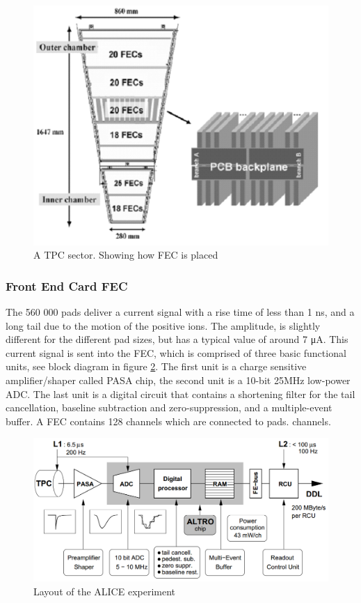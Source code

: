 \documentclass[12pt]{article}
\numberwithin{figure}{section}
\begin{document}
\begin{figure}[!htbp]
  \centering
  \includegraphics[width=\textwidth]{TPC_Sections.png}
  \caption{A TPC sector. Showing how FEC is placed \cite{roed}}
  \label{TPC_Sections}
\end{figure}

\subsubsection{Front End Card FEC}
The 560 000 pads deliver a current signal with a rise time of less than 1 ns, and a long tail due to the motion of the positive ions.
The amplitude, is slightly different for the different pad sizes, but has a typical value of around 7 μA.
This current signal is sent into the \acf{FEC}, which is comprised of three basic functional units, see block diagram in figure \ref{FEC_blockdiagram}.
The first unit is a charge sensitive amplifier/shaper called PASA chip, the second unit is a 10-bit 25MHz low-power ADC.
The last unit is a digital circuit that contains a shortening filter for the tail cancellation, baseline subtraction
and zero-suppression, and a multiple-event buffer. A \acf{FEC} contains 128 channels which are connected to pads.
channels.


\begin{figure}[!htbp]
  \centering
  \includegraphics[width=\textwidth]{FEC_blockdiagram.png}
  \caption{Layout of the ALICE experiment \cite{website:aliceinfo}}
  \label{FEC_blockdiagram}
\end{figure}
\end{document}
